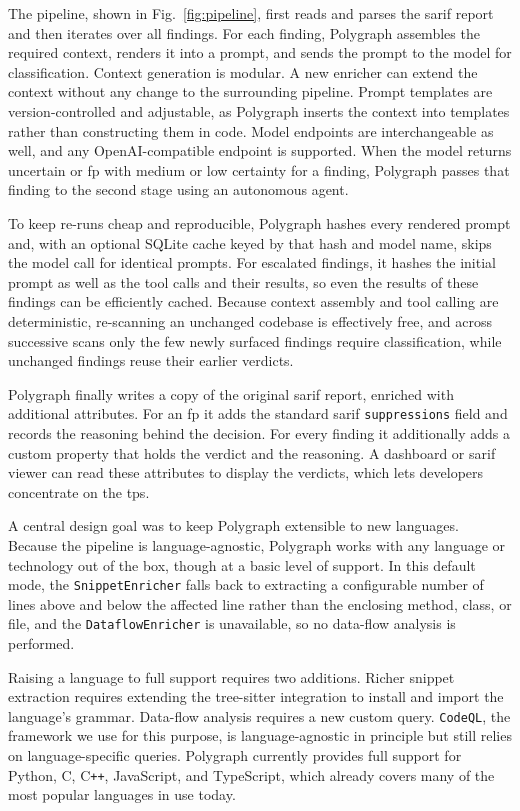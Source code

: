 The pipeline, shown in Fig.~\ref{fig:pipeline}, first reads and parses the \ac{sarif}
report and then iterates over all findings. For each finding, Polygraph
assembles the required context, renders it into a prompt, and sends the prompt
to the model for classification. Context generation is modular. A new enricher
can extend the context without any change to the surrounding pipeline. Prompt
templates are version-controlled and adjustable, as Polygraph inserts the
context into templates rather than constructing them in code. Model
endpoints are interchangeable as well, and any OpenAI-compatible endpoint is
supported. When the model returns uncertain or \ac{fp}
with medium or low certainty for a finding, Polygraph passes that finding to the
second stage using an autonomous agent.

To keep re-runs cheap and reproducible, Polygraph hashes every rendered prompt
and, with an optional SQLite cache keyed by that hash and model name, skips the
model call for identical prompts. For escalated findings, it hashes the initial
prompt as well as the tool calls and their results, so even the results of these
findings can be efficiently cached. Because context assembly and tool calling are deterministic,
re-scanning an unchanged codebase is effectively free, and across successive
scans only the few newly surfaced findings require classification, while
unchanged findings reuse their earlier verdicts.

Polygraph finally writes a copy of the original \ac{sarif} report, enriched with
additional attributes. For an \ac{fp} it adds the standard \ac{sarif}
\texttt{suppressions} field and records the reasoning behind the decision. For
every finding it additionally adds a custom property that
holds the verdict and the reasoning. A dashboard or \ac{sarif} viewer can read these
attributes to display the verdicts, which lets developers concentrate on the
\acp{tp}.

A central design goal was to keep Polygraph extensible to new languages. Because the
pipeline is language-agnostic, Polygraph works with any language or
technology out of the box, though at a basic level of support. In this default mode,
the \texttt{SnippetEnricher} falls back to extracting a configurable number of lines
above and below the affected line rather than the enclosing method, class, or file, and
the \texttt{DataflowEnricher} is unavailable, so no data-flow analysis is performed.

Raising a language to full support requires two additions. Richer snippet extraction
requires extending the tree-sitter integration to install and import the language's
grammar. Data-flow analysis requires a new custom query. \texttt{CodeQL}, the framework
we use for this purpose, is language-agnostic in principle but still relies on
language-specific queries. Polygraph currently provides full support for Python, C,
C\texttt{++}, JavaScript, and TypeScript, which already covers many of the most
popular languages in use today.

